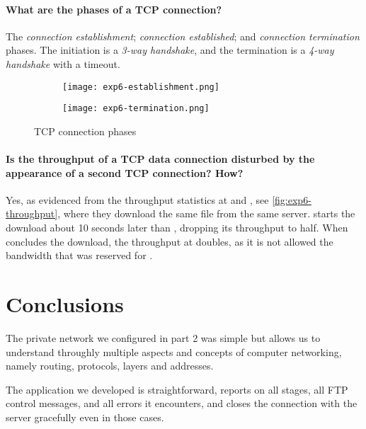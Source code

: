 \documentclass[compilation.tex]{subfiles}
\begin{document}
\paragraph{What are the phases of a TCP connection?}
The \textsl{connection establishment}; \textsl{connection established}; and \textsl{connection termination} phases. The initiation is a \textit{3-way handshake}, and the termination is a \textit{4-way handshake} with a timeout.

\begin{figure}[hbtp]
\centering
\begin{subfigure}[hbtp]{\textwidth}
	\centering
	\texttt{[image: exp6-establishment.png]}
	\vspace*{.8\baselineskip}
\end{subfigure}
\begin{subfigure}[hbtp]{\textwidth}
	\centering
	\texttt{[image: exp6-termination.png]}
	\vspace*{.8\baselineskip}
\end{subfigure}
\caption{TCP connection phases}
\label{fig:exp6-phases}
\end{figure}

\paragraph{Is the throughput of a TCP data connection disturbed by the appearance of a second TCP connection? How?}

Yes, as evidenced from the throughput statistics at  and , see \autoref{fig:exp6-throughput}, where they download the same file from the same server.  starts the download about 10 seconds later than , dropping its throughput to half. When  concludes the download, the throughput at  doubles, as it is not allowed the bandwidth that was reserved for .

\section{Conclusions}
\label{sec:conclusions}

The private network we configured in part 2 was simple but allows us to understand throughly multiple aspects and concepts of computer networking, namely routing, protocols, layers and addresses.

The  application we developed is straightforward, reports on all stages, all FTP control messages, and all errors it encounters, and closes the connection with the server gracefully even in those cases.
\end{document}
